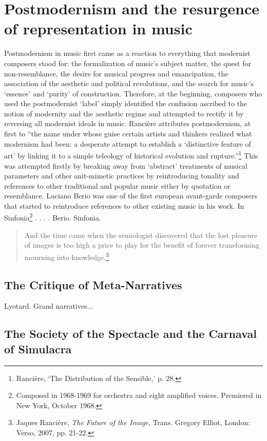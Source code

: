 \section{Postmodernism and the resurgence of representation in music}

Postmodernism in music first came as a reaction to everything that modernist composers stood for: the formalization of music's subject matter, the quest for non-resemblance, the desire for musical progress and emancipation, the association of the aesthetic and political revolutions, and the search for music's `essence' and `purity' of construction. Therefore, at the beginning, composers who used the postmodernist `label' simply identified the confusion ascribed to the notion of modernity and the aesthetic regime and attempted to rectify it by reversing all modernist ideals in music. Ranci\`{e}re attributes postmodernism, at first to ``the name under whose guise certain artists and thinkers realized what modernism had been: a desperate attempt to establish a `distinctive feature of art' by linking it to a simple teleology of historical evolution and rupture.''\footnote{Ranci\`{e}re, `The Distribution of the Sensible,' p. 28.} This was attempted firstly by breaking away from `abstract' treatments of musical parameters and other anit-mimetic practices by reintroducing tonality and references to other traditional and popular music either by quotation or resemblance. Luciano Berio was one of the first european avant-garde composers that started to reintroduce references to other existing music in his work. In Sinfonia\footnote{Composed in 1968-1969 for orchestra and eight amplified voices. Premiered in New York, October 1968.} . . . . 
Berio. Sinfonia.


\begin{quote}
And the time came when the semiologist discovered that the lost pleasure of images is too high a price to play for the benefit of forever transforming mourning into knowledge.\footnote{Jaques Ranci\`{e}re, \emph{The Future of the Image}, Trans. Gregory Elliot, London: Verso, 2007, pp. 21-22.}
\end{quote}



\subsection{The Critique of Meta-Narratives}

Lyotard. Grand narratives...


\subsection{The Society of the Spectacle and the Carnaval of Simulacra}


